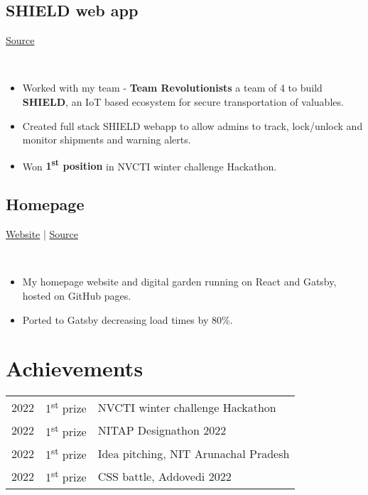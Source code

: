 \documentclass[]{article}
\newcommand{\subheading}[2]{
  {\subsection{#1}
  \hfill{#2}}\\
  \vspace{2pt}
}
\newenvironment{tightemize}{
\vspace{-\topsep}\begin{itemize}\itemsep1pt \parskip0pt \parsep0pt}
{\end{itemize}\vspace{-\topsep}}
\begin{document}
    \subheading{SHIELD web app}{\href{https://github.com/tripathics}{Source}}
    \begin{tightemize}
      \item Worked with my team - \textbf{Team Revolutionists} a team of 4 to build \textbf{SHIELD}, an IoT based ecosystem for secure transportation of valuables.
      \item Created full stack SHIELD webapp to allow admins to track, lock/unlock and monitor shipments and warning alerts.
      \item Won \textbf{1\textsuperscript{st} position} in NVCTI winter challenge Hackathon.
    \end{tightemize}

    \subheading{Homepage}{
      \href{https://tripathics.github.io}{Website} | 
      \href{https://github.com/tripathics/tripathics.githbu.io/tree/src}{Source} 
    }
    \begin{tightemize}
      \item My homepage website and digital garden running on React and Gatsby, hosted on GitHub pages.
      \item Ported to Gatsby decreasing load times by 80\%.
    \end{tightemize}

    \section{Achievements}
    \begin{tabular}{rll}
      2022 & 1\textsuperscript{st} prize & NVCTI winter challenge Hackathon\\
      2022 & 1\textsuperscript{st} prize & NITAP Designathon 2022\\
      2022 & 1\textsuperscript{st} prize & Idea pitching, NIT Arunachal Pradesh\\
      2022 & 1\textsuperscript{st} prize & CSS battle, Addovedi 2022\\
    \end{tabular}
\end{document}

